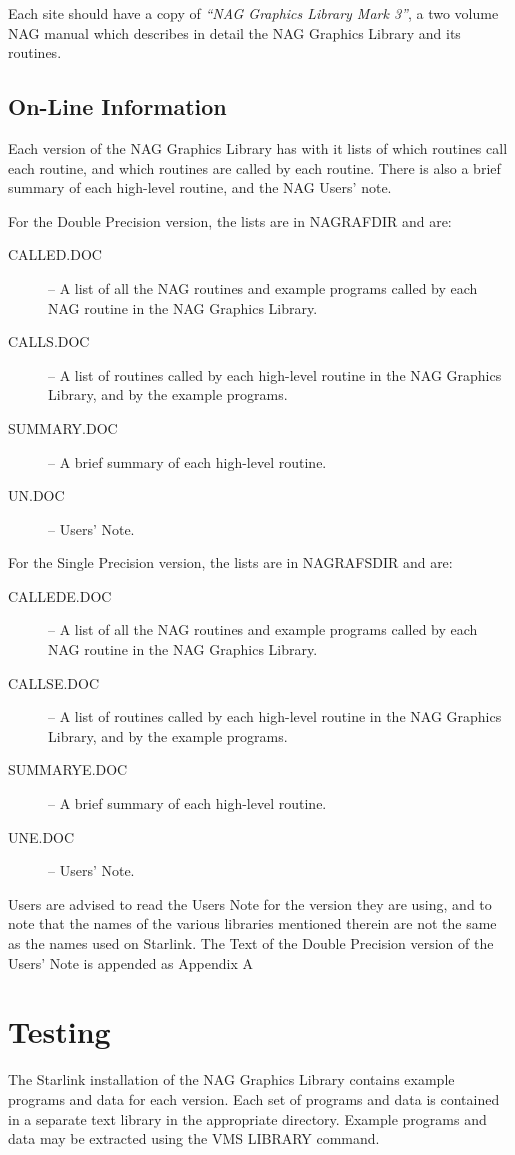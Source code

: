 Each site should have a copy of {\em ``NAG Graphics Library Mark 3''\/}, a two
volume NAG manual which describes in detail the NAG Graphics Library and its
routines.

\subsection{On-Line Information}

Each version of the NAG Graphics Library has with it lists of which routines
call each routine, and which routines are called by each routine. There is also
a brief summary of each high-level routine, and the NAG Users' note.

For the Double Precision version, the lists are in NAGRAFDIR and are:
\begin{description}
\item[CALLED.DOC] -- A list of all the NAG routines and example programs called
by each NAG routine in the NAG Graphics Library.
\item[CALLS.DOC] -- A list of routines called by each high-level routine in the
NAG Graphics Library, and by the example programs.
\item[SUMMARY.DOC] -- A brief summary of each high-level routine.
\item[UN.DOC] -- Users' Note.
\end{description}

For the Single Precision version, the lists are in NAGRAFSDIR and are:
\begin{description}
\item[CALLEDE.DOC] -- A list of all the NAG routines and example programs called
by each NAG routine in the NAG Graphics Library.
\item[CALLSE.DOC] -- A list of routines called by each high-level routine in the
NAG Graphics Library, and by the example programs.
\item[SUMMARYE.DOC] -- A brief summary of each high-level routine.
\item[UNE.DOC] -- Users' Note.
\end{description}

Users are advised to read the Users Note for the version they are using, and to
note that the names of the various libraries mentioned therein are not the same
as the names used on Starlink. The Text of the Double Precision version of the
Users' Note is appended as Appendix A

\section{Testing}
The Starlink installation of the NAG Graphics Library contains example programs
and data for each version. Each set of programs and data is contained in a
separate text library in the appropriate directory. Example programs and data
may be extracted using the VMS LIBRARY command.

